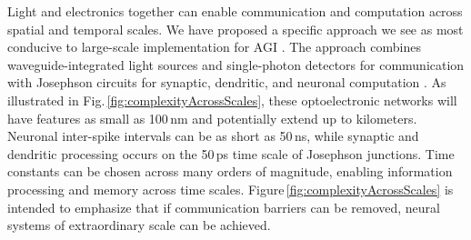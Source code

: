 \documentclass[twocolumn]{article}
\begin{document}
{Light and electronics together can enable communication and computation across spatial and temporal scales. We have proposed a specific approach we see as most conducive to large-scale implementation for AGI \cite{shbu2017,sh2018,sh2018_ICRC,sh2020}. The approach combines waveguide-integrated light sources and single-photon detectors for communication \cite{shbu2017,buch2017} with Josephson circuits for synaptic, dendritic, and neuronal computation \cite{sh2018,sh2020}. As illustrated in Fig.\,\ref{fig:complexityAcrossScales}, these optoelectronic networks will have features as small as 100\,nm and potentially extend up to kilometers. Neuronal inter-spike intervals can be as short as 50\,ns, while synaptic and dendritic processing occurs on the 50\,ps time scale of Josephson junctions. Time constants can be chosen across many orders of magnitude, enabling information processing and memory across time scales. Figure\,\ref{fig:complexityAcrossScales} is intended to emphasize that if communication barriers can be removed, neural systems of extraordinary scale can be achieved.

\begin{figure}[tb]
\end{figure}

}
\end{document}
